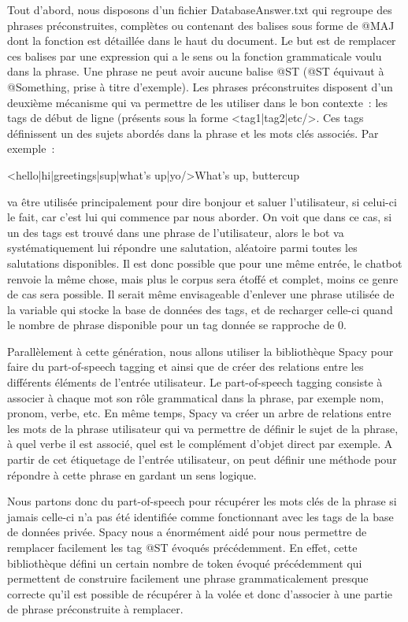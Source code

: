 \documentclass[paper=a4, fontsize=11pt]{article}
\begin{document}
Tout d’abord, nous disposons d’un fichier DatabaseAnswer.txt qui regroupe des phrases préconstruites, complètes ou contenant des balises sous forme de @MAJ dont la fonction est détaillée dans le haut du document. Le but est de remplacer ces balises par une expression qui a le sens ou la fonction grammaticale voulu dans la phrase. Une phrase ne peut avoir aucune balise @ST (@ST équivaut à @Something, prise à titre d’exemple). Les phrases préconstruites disposent d’un deuxième mécanisme qui va permettre de les utiliser dans le bon contexte : les tags de début de ligne (présents sous la forme \textless tag1|tag2|etc/\textgreater. Ces tags définissent un des sujets abordés dans la phrase et les mots clés associés. Par exemple :
\begin{center}
\textless hello|hi|greetings|sup|what's up|yo/\textgreater What's up, buttercup
\end{center}
va être utilisée principalement pour dire bonjour et saluer l’utilisateur, si celui-ci le fait, car c’est lui qui commence par nous aborder. On voit que dans ce cas, si un des tags est trouvé dans une phrase de l’utilisateur, alors le bot va systématiquement lui répondre une salutation, aléatoire parmi toutes les salutations disponibles. Il est donc possible que pour une même entrée, le chatbot renvoie la même chose, mais plus le corpus sera étoffé et complet, moins ce genre de cas sera possible. Il serait même envisageable d’enlever une phrase utilisée de la variable qui stocke la base de données des tags, et de recharger celle-ci quand le nombre de phrase disponible pour un tag donnée se rapproche de 0.


Parallèlement à cette génération, nous allons utiliser la bibliothèque Spacy pour faire du part-of-speech tagging et ainsi que de créer des relations entre les différents éléments de l’entrée utilisateur.
Le part-of-speech tagging consiste à associer à chaque mot son rôle grammatical dans la phrase, par exemple nom, pronom, verbe, etc. En même temps, Spacy va créer un arbre de relations entre les mots de la phrase utilisateur qui va permettre de définir le sujet de la phrase, à quel verbe il est associé, quel est le complément d’objet direct par exemple. A partir de cet étiquetage de l’entrée utilisateur, on peut définir une méthode pour répondre à cette phrase en gardant un sens logique.


	Nous partons donc du part-of-speech pour récupérer les mots clés de la phrase si jamais celle-ci n’a pas été identifiée comme fonctionnant avec les tags de la base de données privée. Spacy nous a énormément aidé pour nous permettre de remplacer facilement les tag @ST évoqués précédemment. En effet, cette bibliothèque défini un certain nombre de token évoqué précédemment qui permettent de construire facilement une phrase grammaticalement presque correcte qu’il est possible de récupérer à la volée et donc d’associer à une partie de phrase préconstruite à remplacer.
	
\end{document}
